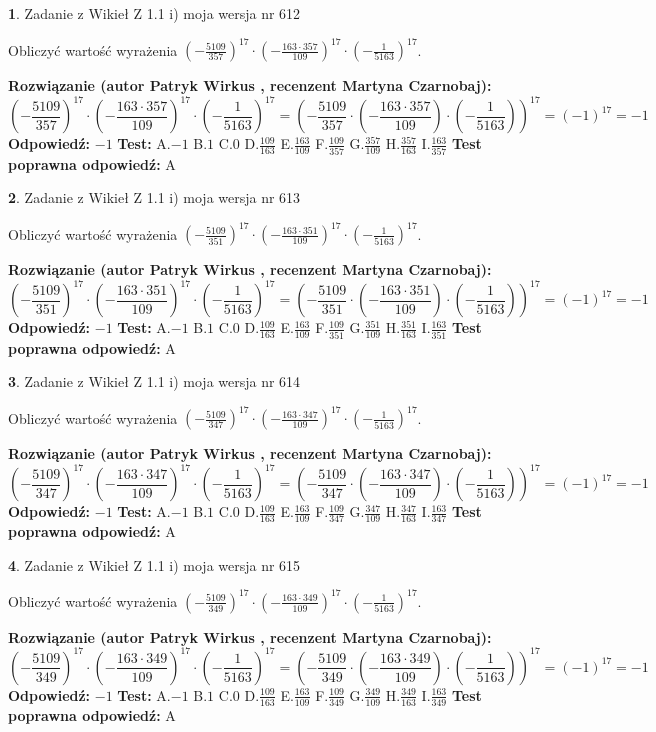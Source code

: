 \documentclass[12pt, a4paper]{article}
\theoremstyle{definition} %
\newtheorem{zad}{}
\newcommand{\zadStart}[1]{\begin{zad}#1\newline}
\newcommand{\zadStop}{\end{zad}}
\newcommand{\rozwStart}[2]{\noindent \textbf{Rozwiązanie (autor #1 , recenzent #2): }\newline}
\newcommand{\rozwStop}{\newline}
\newcommand{\odpStart}{\noindent \textbf{Odpowiedź:}\newline}
\newcommand{\odpStop}{\newline}
\newcommand{\testStart}{\noindent \textbf{Test:}\newline}
\newcommand{\testStop}{\newline}
\newcommand{\kluczStart}{\noindent \textbf{Test poprawna odpowiedź:}\newline}
\newcommand{\kluczStop}{\newline}
\begin{document}
\zadStart{Zadanie z Wikieł Z 1.1 i) moja wersja nr 612}

Obliczyć wartość wyrażenia $(-\frac{5109}{357})^{17} \cdot (-\frac{163 \cdot 357}{109})^{17} \cdot (-\frac{1}{5163})^{17}$.
\zadStop
\rozwStart{Patryk Wirkus}{Martyna Czarnobaj}
$$(-\frac{5109}{357})^{17} \cdot (-\frac{163 \cdot 357}{109})^{17} \cdot (-\frac{1}{5163})^{17} = (-\frac{5109}{357} \cdot (-\frac{163 \cdot 357}{109}) \cdot (-\frac{1}{5163}))^{17} = (-1)^{17} = -1$$
\rozwStop
\odpStart
$-1$
\odpStop
\testStart
A.$-1$ B.$1$ C.$0$ D.$\frac{109}{163}$ E.$\frac{163}{109}$
F.$\frac{109}{357}$ G.$\frac{357}{109}$
H.$\frac{357}{163}$
I.$\frac{163}{357}$
\testStop
\kluczStart
A
\kluczStop



\zadStart{Zadanie z Wikieł Z 1.1 i) moja wersja nr 613}

Obliczyć wartość wyrażenia $(-\frac{5109}{351})^{17} \cdot (-\frac{163 \cdot 351}{109})^{17} \cdot (-\frac{1}{5163})^{17}$.
\zadStop
\rozwStart{Patryk Wirkus}{Martyna Czarnobaj}
$$(-\frac{5109}{351})^{17} \cdot (-\frac{163 \cdot 351}{109})^{17} \cdot (-\frac{1}{5163})^{17} = (-\frac{5109}{351} \cdot (-\frac{163 \cdot 351}{109}) \cdot (-\frac{1}{5163}))^{17} = (-1)^{17} = -1$$
\rozwStop
\odpStart
$-1$
\odpStop
\testStart
A.$-1$ B.$1$ C.$0$ D.$\frac{109}{163}$ E.$\frac{163}{109}$
F.$\frac{109}{351}$ G.$\frac{351}{109}$
H.$\frac{351}{163}$
I.$\frac{163}{351}$
\testStop
\kluczStart
A
\kluczStop



\zadStart{Zadanie z Wikieł Z 1.1 i) moja wersja nr 614}

Obliczyć wartość wyrażenia $(-\frac{5109}{347})^{17} \cdot (-\frac{163 \cdot 347}{109})^{17} \cdot (-\frac{1}{5163})^{17}$.
\zadStop
\rozwStart{Patryk Wirkus}{Martyna Czarnobaj}
$$(-\frac{5109}{347})^{17} \cdot (-\frac{163 \cdot 347}{109})^{17} \cdot (-\frac{1}{5163})^{17} = (-\frac{5109}{347} \cdot (-\frac{163 \cdot 347}{109}) \cdot (-\frac{1}{5163}))^{17} = (-1)^{17} = -1$$
\rozwStop
\odpStart
$-1$
\odpStop
\testStart
A.$-1$ B.$1$ C.$0$ D.$\frac{109}{163}$ E.$\frac{163}{109}$
F.$\frac{109}{347}$ G.$\frac{347}{109}$
H.$\frac{347}{163}$
I.$\frac{163}{347}$
\testStop
\kluczStart
A
\kluczStop



\zadStart{Zadanie z Wikieł Z 1.1 i) moja wersja nr 615}

Obliczyć wartość wyrażenia $(-\frac{5109}{349})^{17} \cdot (-\frac{163 \cdot 349}{109})^{17} \cdot (-\frac{1}{5163})^{17}$.
\zadStop
\rozwStart{Patryk Wirkus}{Martyna Czarnobaj}
$$(-\frac{5109}{349})^{17} \cdot (-\frac{163 \cdot 349}{109})^{17} \cdot (-\frac{1}{5163})^{17} = (-\frac{5109}{349} \cdot (-\frac{163 \cdot 349}{109}) \cdot (-\frac{1}{5163}))^{17} = (-1)^{17} = -1$$
\rozwStop
\odpStart
$-1$
\odpStop
\testStart
A.$-1$ B.$1$ C.$0$ D.$\frac{109}{163}$ E.$\frac{163}{109}$
F.$\frac{109}{349}$ G.$\frac{349}{109}$
H.$\frac{349}{163}$
I.$\frac{163}{349}$
\testStop
\kluczStart
A
\kluczStop
\end{document}
